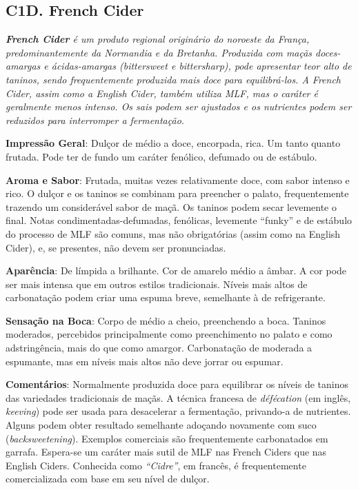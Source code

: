 \subsection*{C1D. French Cider}

\textit{\textbf{French Cider} é um produto regional originário do noroeste da França, predominantemente da Normandia e da Bretanha. Produzida com maçãs doces-amargas e ácidas-amargas (\textit{bittersweet} e \textit{bittersharp}), pode apresentar teor alto de taninos, sendo frequentemente produzida mais doce para equilibrá-los. A French Cider, assim como a English Cider, também utiliza MLF, mas o caráter é geralmente menos intenso. Os sais podem ser ajustados e os nutrientes podem ser reduzidos para interromper a fermentação.}

\textbf{Impressão Geral}: Dulçor de médio a doce, encorpada, rica. Um tanto quanto frutada. Pode ter de fundo um caráter fenólico, defumado ou de estábulo.

\textbf{Aroma e Sabor}: Frutada, muitas vezes relativamente doce, com sabor intenso e rico. O dulçor e os taninos se combinam para preencher o palato, frequentemente trazendo um considerável sabor de maçã. Os taninos podem secar levemente o final. Notas condimentadas-defumadas, fenólicas, levemente “funky” e de estábulo do processo de MLF são comuns, mas não obrigatórias (assim como na English Cider), e, se presentes, não devem ser pronunciadas.

\textbf{Aparência}: De límpida a brilhante. Cor de amarelo médio a âmbar. A cor pode ser mais intensa que em outros estilos tradicionais. Níveis mais altos de carbonatação podem criar uma espuma breve, semelhante à de refrigerante.

\textbf{Sensação na Boca}: Corpo de médio a cheio, preenchendo a boca. Taninos moderados, percebidos principalmente como preenchimento no palato e como adstringência, mais do que como amargor. Carbonatação de moderada a espumante, mas em níveis mais altos não deve jorrar ou espumar.

\textbf{Comentários}: Normalmente produzida doce para equilibrar os níveis de taninos das variedades tradicionais de maçãs. A técnica francesa de \textit{défécation} (em inglês, \textit{keeving}) pode ser usada para desacelerar a fermentação, privando-a de nutrientes. Alguns podem obter resultado semelhante adoçando novamente com suco (\textit{backsweetening}). Exemplos comerciais são frequentemente carbonatados em garrafa. Espera-se um caráter mais sutil de MLF nas French Ciders que nas English Ciders. Conhecida como \textit{“Cidre”}, em francês, é frequentemente comercializada com base em seu nível de dulçor.

